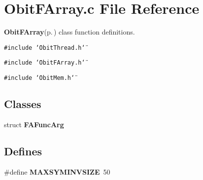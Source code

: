 \section{Obit\-FArray.c File Reference}
\label{ObitFArray_8c}
{\bf Obit\-FArray}{\rm (p.\,\pageref{structObitFArray})} class function definitions. 

{\tt \#include \char`\"{}Obit\-Thread.h\char`\"{}}\par
{\tt \#include \char`\"{}Obit\-FArray.h\char`\"{}}\par
{\tt \#include \char`\"{}Obit\-Mem.h\char`\"{}}\par
\subsection*{Classes}
\begin{CompactItemize}
\item 
struct {\bf FAFunc\-Arg}
\end{CompactItemize}
\subsection*{Defines}
\begin{CompactItemize}
\item 
\#define {\bf MAXSYMINVSIZE}\ 50
\end{CompactItemize}
